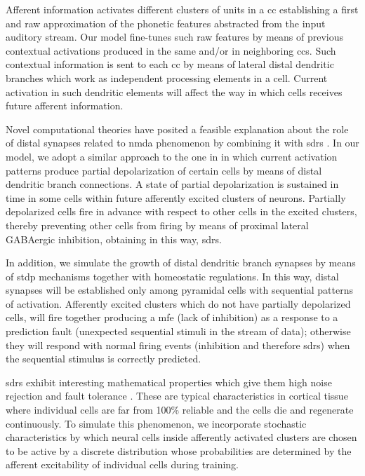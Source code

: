 \documentclass[10pt,letterpaper]{article}
\begin{document}
Afferent information activates different clusters of units in a \gls{cc} establishing a first and raw approximation of the phonetic features abstracted from the input auditory stream. Our model fine-tunes such raw features by means of previous contextual activations produced in the same and/or in neighboring \glspl{cc}. Such contextual information is sent to each \gls{cc} by means of lateral distal dendritic branches which work as independent processing elements in a cell. Current activation in such dendritic elements will affect the way in which cells receives future afferent information.

Novel computational theories have posited a feasible explanation about the role of distal synapses related to \gls{nmda}
phenomenon \cite{hawkins_2016} by combining it with \glspl{sdr} \cite{ahmad_2016}. In our model, we adopt a similar approach to the one in \cite{hawkins_2016} in which current activation patterns produce partial depolarization of certain cells by means of distal dendritic branch connections. A state of partial depolarization is sustained in time in some cells within
future afferently excited clusters of neurons. Partially depolarized cells fire in advance with respect to other cells in the excited clusters, thereby preventing other cells from firing by means of proximal lateral GABAergic inhibition, obtaining in this way, \glspl{sdr}.

In addition, we simulate the growth of distal dendritic branch synapses by means of \gls{stdp} mechanisms together with
homeostatic regulations. In this way, distal synapses will be established only among pyramidal cells with sequential patterns
of activation. Afferently excited clusters which do not have partially depolarized cells,
will fire together producing a \gls{mfe}
(lack of inhibition) as a response to a prediction fault (unexpected sequential stimuli in the stream of data); otherwise they will respond with normal firing events (inhibition and therefore \glspl{sdr}) when the sequential stimulus is
correctly predicted.

\glspl{sdr} exhibit interesting mathematical properties which give them high noise rejection and fault tolerance \cite{ahmad_2015}.
These are typical characteristics in cortical tissue where individual cells are far from 100\% reliable and the cells die and regenerate continuously. To simulate this phenomenon, we incorporate stochastic characteristics by which neural cells inside afferently activated clusters are chosen to be active by a discrete distribution whose probabilities are determined by the afferent excitability of individual cells during training.
\end{document}
